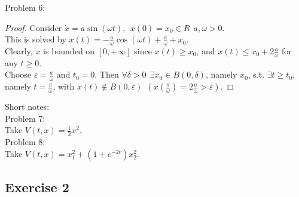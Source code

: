 Problem 6:
\begin{proof}
    Consider $\dot x = a \sin(\omega t), \ \ x(0)=x_0 \in R \ \ a, \omega >0.$ \\
    This is solved by $x(t) = - \frac{a}{\omega} \cos (\omega t) + \frac{a}{\omega} + x_0.$ \\
    Clearly, $x$ is bounded on $[0, +\infty]$ since $x(t) \ge x_0$, and $x(t) \le x_0+2 \frac{a}{\omega}$ for any $t \ge 0$. \\
    Choose $\varepsilon = \frac{a}{\omega}$ and $t_0=0$. Then $\forall \delta > 0 \ \ \exists x_0 \in B(0, \delta)$, namely $x_0$, s.t. $\exists t \ge t_0$, namely $t=\frac{\pi}{\omega}$, with $x(t) \notin B(0, \varepsilon) \ \ (x(\frac{\pi}{\omega})=2\frac{a}{\omega} > \varepsilon).$
\end{proof}

Short notes: \\

Problem 7: \\
Take $V(t,x)=\frac{1}{2}x^2$.\\

Problem 8: \\
Take $V(t,x)=x_1^2+(1+e^{-2t})x_2^2.$


\subsection{Exercise 2}

